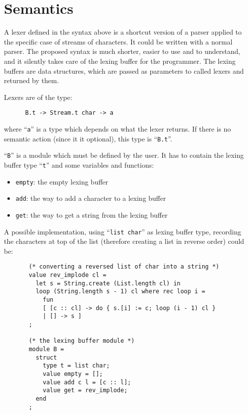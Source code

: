 \documentclass[11pt]{article}
\begin{document}
\section{Semantics}
\label{semantics}

A lexer defined in the syntax above is a shortcut version of a parser
applied to the specific case of streams of characters. It could be
written with a normal parser. The proposed syntax is much shorter,
easier to use and to understand, and it silently takes care of the
lexing buffer for the programmer. The lexing buffers are data
structures, which are passed as parameters to called lexers and
returned by them.

Lexers are of the type:

\begin{verbatim}
      B.t -> Stream.t char -> a
\end{verbatim}

where ``\verb/a/'' is a type which depends on what the lexer
returns. If there is no semantic action (since it it optional), this
type is ``\verb/B.t/''.

``\verb/B/'' is a module which must be defined by the user. It has to
contain the lexing buffer type ``\verb/t/'' and some variables and
functions:

\begin{itemize}
\item \verb/empty/: the empty lexing buffer
\item \verb/add/: the way to add a character to a lexing buffer
\item \verb/get/: the way to get a string from the lexing buffer
\end{itemize}

A possible implementation, using ``\verb/list char/'' as lexing buffer
type, recording the characters at top of the list (therefore creating
a list in reverse order) could be:

\begin{verbatim}
       (* converting a reversed list of char into a string *)
       value rev_implode cl =
         let s = String.create (List.length cl) in
         loop (String.length s - 1) cl where rec loop i =
           fun
           [ [c :: cl] -> do { s.[i] := c; loop (i - 1) cl }
           | [] -> s ]
       ;

       (* the lexing buffer module *)
       module B =
         struct
           type t = list char;
           value empty = [];
           value add c l = [c :: l];
           value get = rev_implode;
         end
       ;
\end{verbatim}
\end{document}
